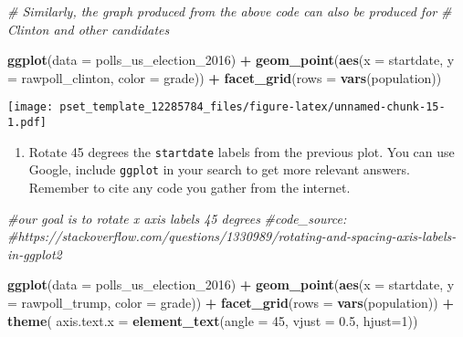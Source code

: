 \documentclass[
]{article}
\newenvironment{Shaded}{\begin{snugshade}}{\end{snugshade}}
\newcommand{\CommentTok}[1]{\textcolor[rgb]{0.56,0.35,0.01}{\textit{#1}}}
\newcommand{\DataTypeTok}[1]{\textcolor[rgb]{0.13,0.29,0.53}{#1}}
\newcommand{\DecValTok}[1]{\textcolor[rgb]{0.00,0.00,0.81}{#1}}
\newcommand{\FloatTok}[1]{\textcolor[rgb]{0.00,0.00,0.81}{#1}}
\newcommand{\KeywordTok}[1]{\textcolor[rgb]{0.13,0.29,0.53}{\textbf{#1}}}
\newcommand{\NormalTok}[1]{#1}
\newcommand{\OperatorTok}[1]{\textcolor[rgb]{0.81,0.36,0.00}{\textbf{#1}}}
\newcommand{\StringTok}[1]{\textcolor[rgb]{0.31,0.60,0.02}{#1}}
\providecommand{\tightlist}{%
  \setlength{\itemsep}{0pt}\setlength{\parskip}{0pt}}
\begin{document}
\begin{Shaded}
\begin{Highlighting}[]
\CommentTok{# Similarly, the graph produced from the above code can also be produced for }
    \CommentTok{# Clinton and other candidates}
    
        \KeywordTok{ggplot}\NormalTok{(}\DataTypeTok{data =}\NormalTok{ polls_us_election_}\DecValTok{2016}\NormalTok{) }\OperatorTok{+}
\StringTok{      }\KeywordTok{geom_point}\NormalTok{(}\KeywordTok{aes}\NormalTok{(}\DataTypeTok{x =}\NormalTok{ startdate, }
                     \DataTypeTok{y =}\NormalTok{ rawpoll_clinton, }
                     \DataTypeTok{color =}\NormalTok{ grade)) }\OperatorTok{+}
\StringTok{      }\KeywordTok{facet_grid}\NormalTok{(}\DataTypeTok{rows =} \KeywordTok{vars}\NormalTok{(population))}
\end{Highlighting}
\end{Shaded}

\texttt{[image: pset\_template\_12285784\_files/figure-latex/unnamed-chunk-15-1.pdf]}

\begin{enumerate}
\def\labelenumi{\arabic{enumi}.}
\tightlist
\item
  Rotate 45 degrees the \texttt{startdate} labels from the previous
  plot. You can use Google, include \texttt{ggplot} in your search to
  get more relevant answers. Remember to cite any code you gather from
  the internet.
\end{enumerate}

\begin{Shaded}
\begin{Highlighting}[]
\CommentTok{#our goal is to rotate x axis labels 45 degrees}
\CommentTok{#code_source: }
\CommentTok{#https://stackoverflow.com/questions/1330989/rotating-and-spacing-axis-labels-in-ggplot2}

    \KeywordTok{ggplot}\NormalTok{(}\DataTypeTok{data =}\NormalTok{ polls_us_election_}\DecValTok{2016}\NormalTok{) }\OperatorTok{+}
\StringTok{      }\KeywordTok{geom_point}\NormalTok{(}\KeywordTok{aes}\NormalTok{(}\DataTypeTok{x =}\NormalTok{ startdate, }
                     \DataTypeTok{y =}\NormalTok{ rawpoll_trump, }
                     \DataTypeTok{color =}\NormalTok{ grade)) }\OperatorTok{+}
\StringTok{      }\KeywordTok{facet_grid}\NormalTok{(}\DataTypeTok{rows =} \KeywordTok{vars}\NormalTok{(population)) }\OperatorTok{+}\StringTok{ }\KeywordTok{theme}\NormalTok{(}
        \DataTypeTok{axis.text.x =} \KeywordTok{element_text}\NormalTok{(}\DataTypeTok{angle =} \DecValTok{45}\NormalTok{, }\DataTypeTok{vjust =} \FloatTok{0.5}\NormalTok{, }\DataTypeTok{hjust=}\DecValTok{1}\NormalTok{))}
\end{Highlighting}
\end{Shaded}
\end{document}

